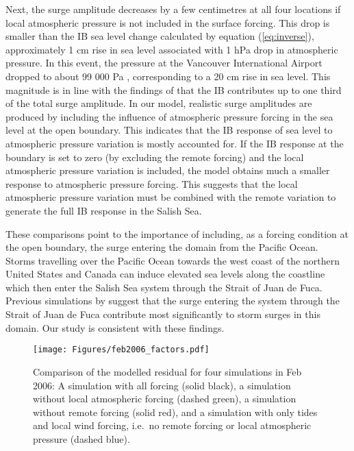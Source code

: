 \documentclass[letterpaper]{tATO2e}
\begin{document}
Next, the surge amplitude decreases by a few centimetres at all four locations if local atmospheric pressure is not included in the surface forcing. This drop is smaller than the IB sea level change calculated by equation (\ref{eq:inverse}), approximately 1 cm rise in sea level associated with 1 hPa drop in atmospheric pressure. In this event, the pressure at the Vancouver International Airport dropped to about 99 000 Pa \citep{ECClimateArchive}, corresponding to a 20 cm rise in sea level. This magnitude is in line with the findings of \citet{murty1995storm} that the IB contributes up to one third of the total surge amplitude. {\color{red} In our model, realistic surge amplitudes are produced by including the influence of atmospheric pressure forcing in the sea level at the open boundary. This indicates that the IB response of sea level to atmospheric pressure variation is mostly accounted for. If the IB response at the boundary is set to zero (by excluding the remote forcing) and the local atmospheric pressure variation is included, the model obtains much a smaller response to atmospheric pressure forcing. This suggests that the local atmospheric pressure variation must be combined with the remote variation to generate the full IB response in the Salish Sea. } 


These comparisons point to the importance of including, as a forcing condition at the open boundary, the surge entering the domain from the Pacific Ocean. Storms travelling over the Pacific Ocean towards the west coast of the northern United States and Canada can induce elevated sea levels along the coastline which then enter the Salish Sea system through the Strait of Juan de Fuca. Previous simulations by \citet{murty1995storm} suggest that the surge entering the system through the Strait of Juan de Fuca contribute most significantly to storm surges in this domain. {\color{red} Our study is consistent with these findings.}  

\begin{figure}
\centering
\texttt{[image: Figures/feb2006\_factors.pdf]}
\caption{Comparison of the modelled residual for four simulations in Feb 2006: A simulation with all forcing (solid black), a simulation without local atmospheric forcing (dashed green), a simulation without remote forcing (solid red), and a simulation with only tides and local wind forcing, i.e.\ no remote forcing or local atmospheric pressure (dashed blue). }
\label{fig:factors}
\end{figure}
\end{document}
